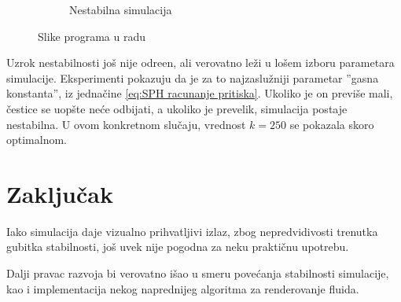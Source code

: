 \documentclass[12pt]{article}
\begin{document}
\begin{figure}[H]
\begin{subfigure}[b]{0.49\textwidth}
        \caption{Nestabilna simulacija}
        \label{fig:Stabilna simulacija}
    \end{subfigure}
    \caption{Slike programa u radu} \label{Slike}
    \end{figure}
    Uzrok nestabilnosti jo\v s nije odre\dj en, ali verovatno le\v zi u lo\v sem izboru parametara simulacije. Eksperimenti pokazuju da je za to najzaslu\v zniji parametar ''gasna konstanta'', iz jedna\v cine \eqref{eq:SPH racunanje pritiska}. Ukoliko je on previ\v se mali, \v cestice se uop\v ste ne\'ce odbijati, a ukoliko je prevelik, simulacija postaje nestabilna. U ovom konkretnom slu\v caju, vrednost $k=250$ se pokazala skoro optimalnom.
\section{Zaklju\v cak}
    Iako simulacija daje vizualno prihvatljivi izlaz, zbog nepredvidivosti trenutka gubitka stabilnosti, jo\v s uvek nije pogodna za neku prakti\v cnu upotrebu. 
    
    Dalji pravac razvoja bi verovatno i\v sao u smeru pove\'canja stabilnosti simulacije, kao i implementacija nekog naprednijeg algoritma za renderovanje fluida.
    
\newpage


\end{document}
